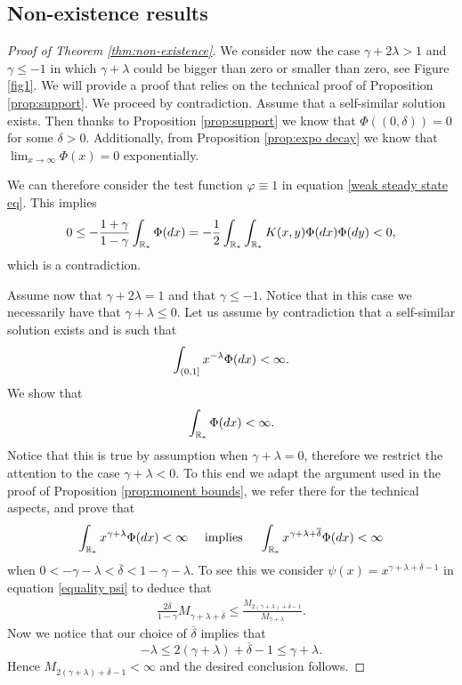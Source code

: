 \documentclass[11pt]{article}
\numberwithin{equation}{section}
\theoremstyle{plain}
\newcommand{\der}{\textup{d}}
\begin{document}
\subsection{Non-existence results}
\begin{proof}[Proof of Theorem \ref{thm:non-existence}]
We consider now the case $\gamma + 2\lambda >1$ and $\gamma \leq -1 $ in which $\gamma + \lambda$ could be bigger than zero or smaller than zero, see Figure \ref{fig1}. 
We will provide a proof that relies on the technical proof of Proposition \ref{prop:support}. 
We proceed by contradiction. Assume that a self-similar solution exists. Then thanks to Proposition \ref{prop:support} we know that $\Phi((0, \delta))=0$ for some $\delta>0$. 
Additionally, from Proposition \ref{prop:expo decay} we know that $\lim_{x \rightarrow \infty } \Phi(x)=0$ exponentially.  

We can therefore consider the test function $\varphi\equiv 1$ in equation \eqref{weak steady state eq}. 
This implies 
\begin{align*}
0\leq- \frac{1+\gamma}{1-\gamma} \int_{\mathbb R_*}  \Phi( \der x) 
 =-\frac{1}{2}\int_{\mathbb R_*} \int_{\mathbb R_*} K(x,y)\Phi( \der x) \Phi( \der y)<0,
\end{align*}
which is a contradiction. 

Assume now that $\gamma + 2 \lambda =1 $ and that $\gamma \leq -1$. Notice that in this case we necessarily have that $\gamma+\lambda \leq 0 $. 
Let us assume by contradiction that a self-similar solution exists and is such that
\[
\int_{(0,1]} x^{-\lambda }\Phi(\der x) < \infty.
\]
We show that
\[
\int_{\mathbb R_*} \Phi(\der x ) < \infty.
\] 
Notice that this is true by assumption when $\gamma+\lambda =0$, therefore we restrict the attention to the case $\gamma +\lambda <0.$
To this end we adapt the argument used in the proof of Proposition \ref{prop:moment bounds}, we refer there for the technical aspects, and prove that 
\[
\int_{\mathbb R_*} x^{\gamma+\lambda} \Phi(\der x) < \infty \quad \text{ implies } \quad 
\int_{\mathbb R_*} x^{\gamma+\lambda+\overline \delta } \Phi(\der x) < \infty
\]
when $ 0 < -\gamma-\lambda <\overline \delta < 1-\gamma-\lambda$. To see this we consider $\psi(x)=x^{\gamma+\lambda+\overline \delta -1 } $ in equation \eqref{equality psi} to deduce that
\begin{align*}
     \frac{2\overline \delta }{1-\gamma} M_{\gamma+\lambda+\overline \delta} \leq \frac{M_{2(\gamma+\lambda)+\overline \delta-1}}{M_{\gamma+\lambda}}.
\end{align*}
Now we notice that our choice of $\overline \delta$ implies that 
\[
- \lambda \leq 2(\gamma+\lambda)+\overline \delta-1 \leq \gamma + \lambda.
\]
Hence $M_{2(\gamma+\lambda)+\overline \delta-1}< \infty$ and the desired conclusion follows. 


\end{proof}
\end{document}

